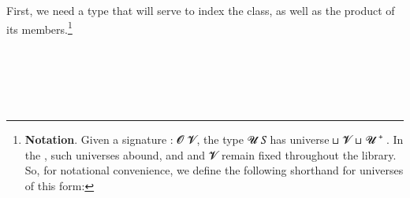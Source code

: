 First, we need a type that will serve to index the class, as well as the product of its members.\footnote{%
\textbf{Notation}. Given a signature  \as :  \ab  𝓞 \ab 𝓥, the type  \ab 𝓤 \ab 𝑆 has universe  \ap ⊔ \ab 𝓥 \ap ⊔ \ab 𝓤 \af ⁺ . In the \ualib, such universes abound, and  and \ab 𝓥 remain fixed throughout the library. So, for notational convenience, we define the following shorthand for universes of this form: 
\AgdaSpace{}%
\AgdaSpace{}%
\AgdaSymbol{=}\AgdaSpace{}%
\AgdaSpace{}%
\AgdaSpace{}%
\AgdaSpace{}%
\AgdaSpace{}%
\AgdaSpace{}%
}
\ccpad
\begin{code}%
\>[0]\AgdaSpace{}%
\AgdaModule{\AgdaUnderscore{}}\AgdaSpace{}%
\AgdaSymbol{\{}\AgdaSpace{}%
\AgdaSpace{}%
\AgdaSymbol{:}\AgdaSpace{}%
\AgdaSymbol{\}\{}\AgdaSpace{}%
\AgdaSymbol{:}\AgdaSpace{}%
\AgdaSpace{}%
\AgdaSymbol{\}}\AgdaSpace{}%
\<%
\\
%
\\[\AgdaEmptyExtraSkip]%
\>[0][@{}l@{\AgdaIndent{0}}]%
\>[1]\AgdaSpace{}%
\AgdaSymbol{:}\AgdaSpace{}%
\AgdaSpace{}%
\AgdaSymbol{(}\AgdaSpace{}%
\AgdaSpace{}%
\AgdaSymbol{)(}\AgdaSpace{}%
\AgdaSymbol{)}\AgdaSpace{}%
\AgdaSpace{}%
\AgdaSymbol{(}\AgdaSpace{}%
\AgdaSpace{}%
\AgdaSpace{}%
\AgdaSymbol{)}\AgdaSpace{}%
\<%
\\
%
\\[\AgdaEmptyExtraSkip]%
%
\>[1]\AgdaSpace{}%
\AgdaSpace{}%
\AgdaSymbol{=}\AgdaSpace{}%
\AgdaSpace{}%
\AgdaSpace{}%
\AgdaSpace{}%
\AgdaSymbol{(}\AgdaSpace{}%
\AgdaSpace{}%
\AgdaSymbol{)}\AgdaSpace{}%
\AgdaFunction{,}\AgdaSpace{}%
\AgdaSymbol{(}\AgdaSpace{}%
\AgdaSpace{}%
\AgdaSymbol{)}\AgdaSpace{}%
\AgdaSpace{}%
\AgdaSymbol{(}\AgdaSpace{}%
\AgdaSpace{}%
\AgdaSpace{}%
\AgdaSpace{}%
\AgdaSymbol{)}\<%
\end{code}

